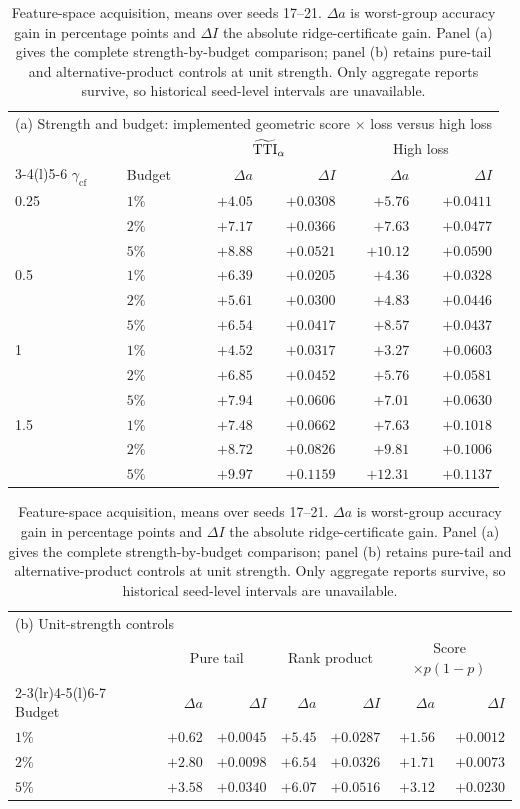 \begin{table}[htbp]
\centering\small
\caption{Feature-space acquisition, means over seeds 17--21. $\Delta a$ is worst-group accuracy gain in percentage points and $\Delta I$ the absolute ridge-certificate gain. Panel (a) gives the complete strength-by-budget comparison; panel (b) retains pure-tail and alternative-product controls at unit strength. Only aggregate reports survive, so historical seed-level intervals are unavailable.}
\label{tab:acquisition-strength}\label{tab:acquisition-budget}\label{tab:acquisition-products}
\begin{tabular}{@{}llrrrr@{}}
\toprule
\multicolumn{6}{l}{(a) Strength and budget: implemented geometric score $\times$ loss versus high loss}\\
 & & \multicolumn{2}{c}{$\widetilde{\mathrm{TTI}}_\alpha$} & \multicolumn{2}{c}{High loss}\\
\cmidrule(lr){3-4}\cmidrule(l){5-6}
$\gamma_{\mathrm{cf}}$ & Budget & $\Delta a$ & $\Delta I$ & $\Delta a$ & $\Delta I$\\
\midrule
0.25 & $1\%$ & $+4.05$ & $+0.0308$ & $+5.76$ & $+0.0411$\\
 & $2\%$ & $+7.17$ & $+0.0366$ & $+7.63$ & $+0.0477$\\
 & $5\%$ & $+8.88$ & $+0.0521$ & $+10.12$ & $+0.0590$\\
0.5 & $1\%$ & $+6.39$ & $+0.0205$ & $+4.36$ & $+0.0328$\\
 & $2\%$ & $+5.61$ & $+0.0300$ & $+4.83$ & $+0.0446$\\
 & $5\%$ & $+6.54$ & $+0.0417$ & $+8.57$ & $+0.0437$\\
1 & $1\%$ & $+4.52$ & $+0.0317$ & $+3.27$ & $+0.0603$\\
 & $2\%$ & $+6.85$ & $+0.0452$ & $+5.76$ & $+0.0581$\\
 & $5\%$ & $+7.94$ & $+0.0606$ & $+7.01$ & $+0.0630$\\
1.5 & $1\%$ & $+7.48$ & $+0.0662$ & $+7.63$ & $+0.1018$\\
 & $2\%$ & $+8.72$ & $+0.0826$ & $+9.81$ & $+0.1006$\\
 & $5\%$ & $+9.97$ & $+0.1159$ & $+12.31$ & $+0.1137$\\
\bottomrule
\end{tabular}

\smallskip
\begin{tabular}{@{}lrrrrrr@{}}
\toprule
\multicolumn{7}{l}{(b) Unit-strength controls}\\
 & \multicolumn{2}{c}{Pure tail} & \multicolumn{2}{c}{Rank product} & \multicolumn{2}{c}{Score $\times p(1-p)$}\\
\cmidrule(lr){2-3}\cmidrule(lr){4-5}\cmidrule(l){6-7}
Budget & $\Delta a$ & $\Delta I$ & $\Delta a$ & $\Delta I$ & $\Delta a$ & $\Delta I$\\
\midrule
$1\%$ & $+0.62$ & $+0.0045$ & $+5.45$ & $+0.0287$ & $+1.56$ & $+0.0012$\\
$2\%$ & $+2.80$ & $+0.0098$ & $+6.54$ & $+0.0326$ & $+1.71$ & $+0.0073$\\
$5\%$ & $+3.58$ & $+0.0340$ & $+6.07$ & $+0.0516$ & $+3.12$ & $+0.0230$\\
\bottomrule
\end{tabular}
\end{table}

